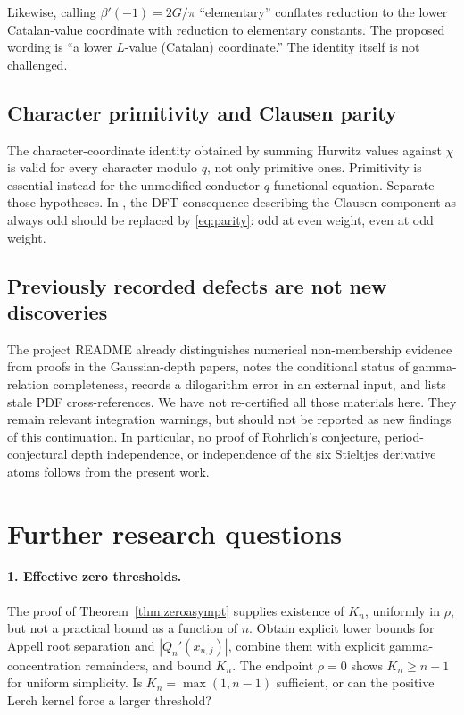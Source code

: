 \documentclass[11pt]{article}
\theoremstyle{definition}
\theoremstyle{remark}
\begin{document}
Likewise, calling $\beta'(-1)=2G/\pi$ ``elementary'' conflates reduction to the lower Catalan-value coordinate with reduction to elementary constants. The proposed wording is ``a lower $L$-value (Catalan) coordinate.'' The identity itself is not challenged.

\subsection{Character primitivity and Clausen parity}
The character-coordinate identity obtained by summing Hurwitz values against $\chi$ is valid for every character modulo $q$, not only primitive ones. Primitivity is essential instead for the unmodified conductor-$q$ functional equation. Separate those hypotheses. In \cite{RepoBridge}, the DFT consequence describing the Clausen component as always odd should be replaced by \eqref{eq:parity}: odd at even weight, even at odd weight.

\subsection{Previously recorded defects are not new discoveries}
The project README already distinguishes numerical non-membership evidence from proofs in the Gaussian-depth papers, notes the conditional status of gamma-relation completeness, records a dilogarithm error in an external input, and lists stale PDF cross-references. We have not re-certified all those materials here. They remain relevant integration warnings, but should not be reported as new findings of this continuation. In particular, no proof of Rohrlich's conjecture, period-conjectural depth independence, or independence of the six Stieltjes derivative atoms follows from the present work.

\section{Further research questions}
\label{sec:questions}

\paragraph{1. Effective zero thresholds.}
The proof of Theorem~\ref{thm:zeroasympt} supplies existence of $K_n$, uniformly in $\rho$, but not a practical bound as a function of $n$. Obtain explicit lower bounds for Appell root separation and $|Q_n'(x_{n,j})|$, combine them with explicit gamma-concentration remainders, and bound $K_n$. The endpoint $\rho=0$ shows $K_n\geq n-1$ for uniform simplicity. Is $K_n=\max(1,n-1)$ sufficient, or can the positive Lerch kernel force a larger threshold?
\end{document}
